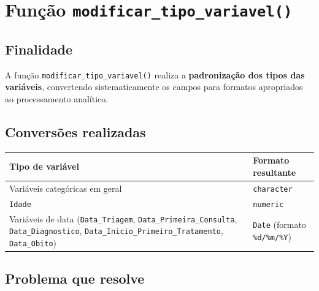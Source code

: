 \documentclass[
  brazilian,
  a4paper,
  oneside]{scrbook}
\newcounter{none} %
\begin{document}
\section{\texorpdfstring{Função
\texttt{modificar\_tipo\_variavel()}}{Função modificar\_tipo\_variavel()}}\label{funuxe7uxe3o-modificar_tipo_variavel}

\subsection{Finalidade}\label{finalidade-2}

A função \texttt{modificar\_tipo\_variavel()} realiza a
\textbf{padronização dos tipos das variáveis}, convertendo
sistematicamente os campos para formatos apropriados ao processamento
analítico.

\subsection{Conversões realizadas}\label{conversuxf5es-realizadas}

{\def\LTcaptype{none} %
\begin{longtable}[]{@{}
  >{\raggedright\arraybackslash}p{}
  >{\raggedright\arraybackslash}p{}@{}}
\toprule\noalign{}
\begin{minipage}[b]{\linewidth}\raggedright
Tipo de variável
\end{minipage} & \begin{minipage}[b]{\linewidth}\raggedright
Formato resultante
\end{minipage} \\
\midrule\noalign{}
\endhead
\bottomrule\noalign{}
\endlastfoot
Variáveis categóricas em geral & \texttt{character} \\
\texttt{Idade} & \texttt{numeric} \\
Variáveis de data (\texttt{Data\_Triagem},
\texttt{Data\_Primeira\_Consulta}, \texttt{Data\_Diagnostico},
\texttt{Data\_Inicio\_Primeiro\_Tratamento}, \texttt{Data\_Obito}) &
\texttt{Date} (formato \texttt{\%d/\%m/\%Y}) \\
\end{longtable}
}

\subsection{Problema que resolve}\label{problema-que-resolve-2}
\end{document}
